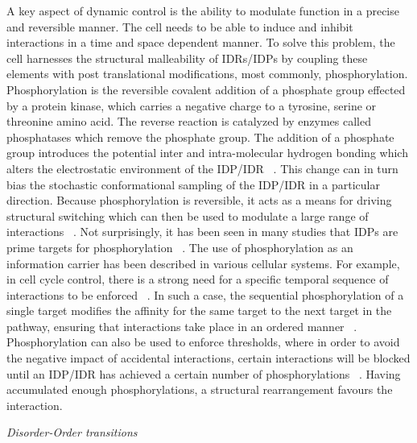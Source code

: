 A key aspect of dynamic control is the ability to modulate function in a precise and reversible manner.  The cell needs to be able to induce and inhibit interactions in a time and space dependent manner. To solve this problem, the cell harnesses the structural malleability of IDRs/IDPs by coupling these elements with post translational modifications, most commonly, phosphorylation. Phosphorylation is the reversible covalent addition of a phosphate  group effected by a protein kinase,  which carries a negative  charge to a tyrosine, serine or threonine  amino acid. The reverse reaction is catalyzed by enzymes called phosphatases which remove the phosphate group. The addition of a phosphate group introduces the potential inter and intra-molecular hydrogen bonding which alters the electrostatic environment of the IDP/IDR ~\cite{van1990effect}. This change can in turn bias the stochastic conformational sampling of the IDP/IDR in a particular direction. Because phosphorylation is reversible, it acts as a means for driving structural switching which can then be used to modulate a large range of interactions ~\cite{kern1999structure, ramelot2001phosphorylation, oxley2008integrin}. Not surprisingly, it has been seen in many studies that IDPs are prime targets for phosphorylation ~\cite{iakoucheva2004importance}.  The use of phosphorylation as an information carrier has been described in various cellular systems. For example, in cell cycle control, there is a strong need for a specific temporal sequence of interactions to be enforced ~\cite{yoon2012cell}. In such a case, the sequential phosphorylation of a single target modifies the affinity for the same target to the next target in the pathway, ensuring that interactions take place in an ordered manner ~\cite{wright2015intrinsically}. Phosphorylation can also be used to enforce thresholds, where in order to avoid the negative impact of accidental interactions, certain interactions will be blocked until an IDP/IDR has achieved a certain number of phosphorylations ~\cite{nash2001multisite}. Having accumulated enough phosphorylations, a structural rearrangement favours the interaction. 

{\it Disorder-Order transitions}


